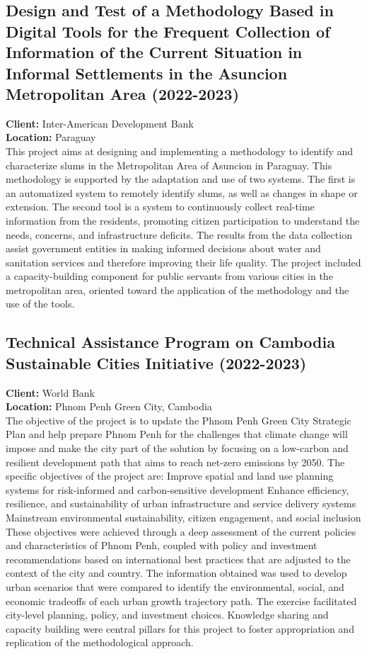\documentclass[
	a4paper,
	12pt,
	unnumberedsections,
]{CSSullivanBusinessReport}
\begin{document}
\subsection{Design and Test of a Methodology Based in Digital Tools for the Frequent Collection of Information of the Current Situation in Informal Settlements in the Asuncion Metropolitan Area (2022-2023)}
\textbf{Client:}  Inter-American Development Bank \\
\textbf{Location:}  Paraguay \\[0.5em]
 This project aims at designing and implementing a methodology to identify and characterize slums in the Metropolitan Area of Asuncion in Paraguay. This methodology is supported by the adaptation and use of two systems. The first is an automatized system to remotely identify slums, as well as changes in shape or extension. The second tool is a system to continuously collect real-time information from the residents, promoting citizen participation to understand the needs, concerns, and infrastructure deficits. The results from the data collection assist government entities in making informed decisions about water and sanitation services and therefore improving their life quality. The project included a capacity-building component for public servants from various cities in the metropolitan area, oriented toward the application of the methodology and the use of the tools.

\subsection{Technical Assistance Program on Cambodia Sustainable Cities Initiative (2022-2023)}
\textbf{Client:}  World Bank \\
\textbf{Location:}  Phnom Penh Green City, Cambodia \\[0.5em]
 The objective of the project is to update the Phnom Penh Green City Strategic Plan and help prepare Phnom Penh for the challenges that climate change will impose and make the city part of the solution by focusing on a low-carbon and resilient development path that aims to reach net-zero emissions by 2050. The specific objectives of the project are:  Improve spatial and land use planning systems for risk-informed and carbon-sensitive development Enhance efficiency, resilience, and sustainability of urban infrastructure and service delivery systems Mainstream environmental sustainability, citizen engagement, and social inclusion These objectives were achieved through a deep assessment of the current policies and characteristics of Phnom Penh, coupled with policy and investment recommendations based on international best practices that are adjusted to the context of the city and country. The information obtained was used to develop urban scenarios that were compared to identify the environmental, social, and economic tradeoffs of each urban growth trajectory path. The exercise facilitated city-level planning, policy, and investment choices. Knowledge sharing and capacity building were central pillars for this project to foster appropriation and replication of the methodological approach.
\end{document}
